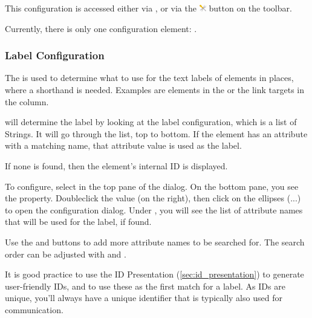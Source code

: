 This configuration is accessed either via , or
via the \includegraphics[height=0.8em]{../rmf-images/ReqIFUIToolExtension.png} button on the toolbar.

Currently, there is only one configuration element: .

\subsubsection{Label Configuration}

The  is used to determine what to use for the text labels of elements
in places, where a shorthand is needed.  Examples are elements in the  or the link targets in the  column.

\pror{} will determine the label by looking at the label configuration, which is a list of Strings.
It will go through the list, top to bottom.  If the element has an attribute with a matching name,
that attribute value is used as the label.

If none is found, then the element's internal ID is displayed.

To configure, select  in the top pane of the dialog.  On the bottom pane, you see the  property.  Doubleclick the value (on the right), then click on the ellipses (...) to open the configuration dialog.  Under , you will see the list of attribute names that will be used for the label, if found.

Use the  and  buttons to add more attribute names to be searched for.  The
search order can be adjusted with  and .

\begin{info}
It is good practice to use the ID Presentation (\ref{sec:id_presentation}) to generate
user-friendly IDs, and to use these as the first match for a label.  As IDs are unique, you'll always
have a unique identifier that is typically also used for communication.
\end{info}

